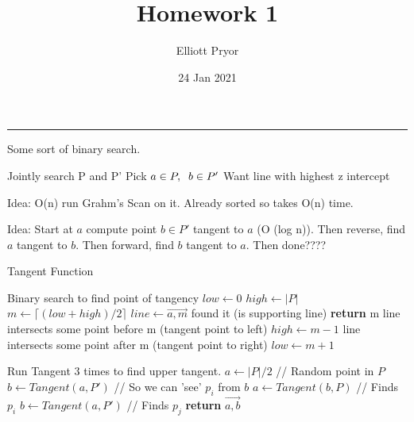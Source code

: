\documentclass[11pt]{article}
\title{Homework 1}
\author{Elliott Pryor}
\date{24 Jan 2021}
\begin{document}
\maketitle

\hrule

Some sort of binary search. 

Jointly search P and P'
Pick $a \in P, \sp b \in P'$
Want line with highest z intercept

Idea: O(n) run Grahm's Scan on it. Already sorted so takes O(n) time.

Idea: Start at $a$ compute point $b \in P'$ tangent to $a$ (O (log n)). 
Then reverse, find $a$ tangent to $b$. Then forward, find $b$ tangent to $a$. Then done????

\begin{algorithm}
    \caption{Tangent Function}\label{guests}
    \label{alg:prob1}
    \begin{algorithmic}[1]
        \State Binary search to find point of tangency
        \State $low \gets 0$
        \State $high \gets |P|$
            \State $m \gets \lceil (low + high)/2 \rceil$
            \State $line \gets \overrightarrow{a,m}$
                \State found it (is supporting line)
                \State \textbf{return} m
                \State line intersects some point before m (tangent point to left)
                \State $high \gets m - 1$
                \State line intersects some point after m (tangent point to right)
                \State $low \gets m + 1$
            \EndIf
        \EndWhile
    \EndFunction
    \end{algorithmic}

    \begin{algorithmic}[1]
            \State Run Tangent 3 times to find upper tangent.
            \State $a \gets |P|/2$ \quad // Random point in $P$
            \State $b \gets Tangent(a, P')$ \quad // So we can 'see' $p_i$ from $b$
            \State $a \gets Tangent(b, P)$ \quad // Finds $p_i$
            \State $b \gets Tangent(a, P')$ \quad // Finds $p_j$
            \State \textbf{return} $\overrightarrow{a,b}$
        \EndFunction
        \end{algorithmic}

\end{algorithm}
\end{document}
